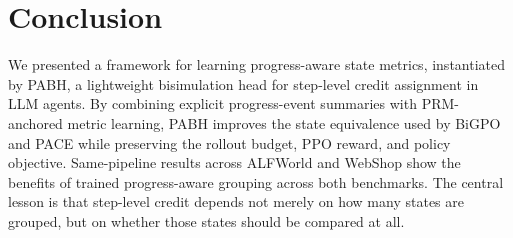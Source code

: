 \documentclass[10pt,twocolumn,letterpaper]{article}
\newcommand{\method}{PABH\xspace}
\begin{document}
\section{Conclusion}
We presented a framework for learning progress-aware state metrics, instantiated by \method, a lightweight bisimulation head for step-level credit assignment in LLM agents. By combining explicit progress-event summaries with PRM-anchored metric learning, \method improves the state equivalence used by BiGPO and PACE while preserving the rollout budget, PPO reward, and policy objective. Same-pipeline results across ALFWorld and WebShop show the benefits of trained progress-aware grouping across both benchmarks. The central lesson is that step-level credit depends not merely on how many states are grouped, but on whether those states should be compared at all.

{\small


}

\appendix

\end{document}
